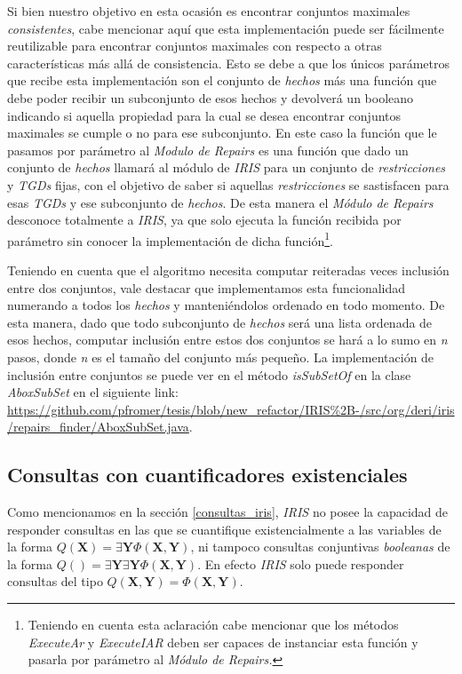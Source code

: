 \documentclass[11pt,a4paper,twoside]{tesis}
\begin{document}
Si bien nuestro objetivo en esta ocasión es encontrar conjuntos maximales \textit{consistentes}, cabe mencionar aquí que esta implementación puede ser fácilmente reutilizable para encontrar conjuntos maximales con respecto a otras características más allá de consistencia. Esto se debe a que los únicos parámetros que recibe esta implementación son el conjunto de \textit{hechos} más una función que debe poder recibir un subconjunto de esos hechos y devolverá un booleano indicando si aquella propiedad para la cual se desea encontrar conjuntos maximales se cumple o no para ese subconjunto. En este caso la función que le pasamos por parámetro al \textit{Modulo de Repairs} es una función que dado un conjunto de \textit{hechos} llamará al módulo de \textit{IRIS} para un conjunto de \textit{restricciones} y \textit{TGDs} fijas, con el objetivo de saber si aquellas \textit{restricciones} se sastisfacen para esas \textit{TGDs} y ese subconjunto de \textit{hechos}. De esta manera el \textit{Módulo de Repairs} desconoce totalmente a \textit{IRIS}, ya que solo ejecuta la función recibida por parámetro sin conocer la implementación de dicha función\footnote{Teniendo en cuenta esta aclaración cabe mencionar que los métodos \textit{ExecuteAr} y \textit{ExecuteIAR} deben ser capaces de instanciar esta función y pasarla por parámetro al \textit{Módulo de Repairs.}}.

Teniendo en cuenta que el algoritmo necesita computar reiteradas veces inclusión entre dos conjuntos, vale destacar que implementamos esta funcionalidad numerando a todos los \textit{hechos} y manteniéndolos ordenado en todo momento. De esta manera, dado que todo subconjunto de \textit{hechos} será una lista ordenada de esos hechos, computar inclusión entre estos dos conjuntos se hará a lo sumo en \textit{n} pasos, donde \textit{n} es el tamaño del conjunto más pequeño. La implementación de inclusión entre conjuntos se puede ver en el método \textit{isSubSetOf} en la clase \textit{AboxSubSet} en el siguiente link: \url{https://github.com/pfromer/tesis/blob/new_refactor/IRIS%2B-/src/org/deri/iris/repairs_finder/AboxSubSet.java}.

\subsection{Consultas con cuantificadores existenciales}

Como mencionamos en la sección \ref{consultas_iris}, \textit{IRIS} no posee la capacidad de responder consultas en las que se cuantifique existencialmente a las variables de la forma $Q(\textbf{X}) = \exists\textbf{Y}\Phi(\textbf{X},\textbf{Y})$, ni tampoco consultas conjuntivas \textit{booleanas} de la forma $Q() = \exists\textbf{Y}\exists\textbf{Y}\Phi(\textbf{X},\textbf{Y})$. En efecto \textit{IRIS} solo puede responder consultas del tipo $Q(\textbf{X},\textbf{Y}) = \Phi(\textbf{X},\textbf{Y})$. 
\end{document}
